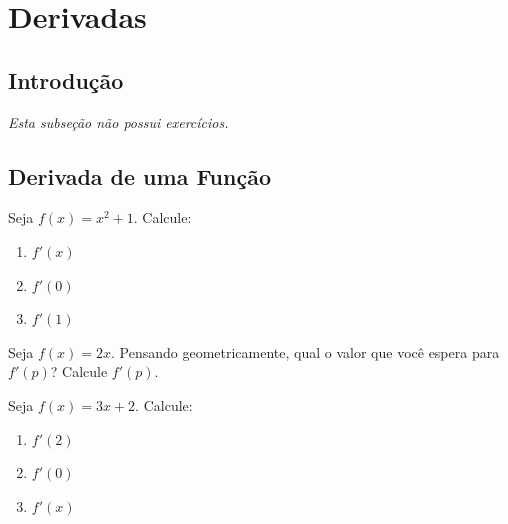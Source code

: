\setcounter{section}{6}
\setcounter{subsection}{1}

\section{Derivadas}

\subsection{Introdução}
\textit{Esta subseção não possui exercícios.}

\clearpage

\subsection{Derivada de uma Função}

\begin{exercicio}[1]
Seja $f(x) = x^2 + 1$. Calcule:
\begin{enumerate}[label=\alph*)]
    \item $f'(x)$
    \item $f'(0)$
    \item $f'(1)$
\end{enumerate}
\end{exercicio}

\begin{exercicio}[2]
Seja $f(x) = 2x$. Pensando geometricamente, qual o valor que você espera para $f'(p)$? Calcule $f'(p)$.
\end{exercicio}

\begin{exercicio}[3]
Seja $f(x) = 3x + 2$. Calcule:
\begin{enumerate}[label=\alph*)]
    \item $f'(2)$
    \item $f'(0)$
    \item $f'(x)$
\end{enumerate}
\end{exercicio}

